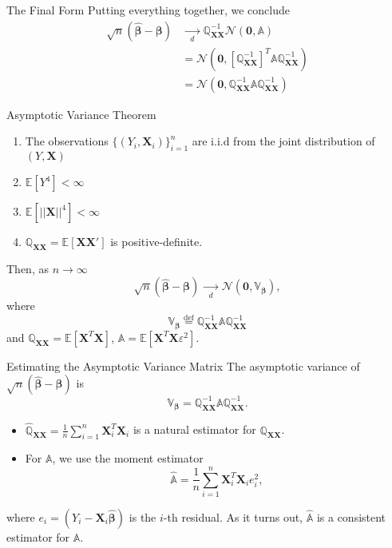 \documentclass[12pt, block=fill]{beamer}
\newcommand{\E}[1]{\mathbb{E}\left[#1\right]}
\renewcommand{\v}[1]{\pmb{#1}}
\newcommand{\m}[1]{\mathbb{#1}}
\newcommand{\eps}{\varepsilon}
\begin{document}
\begin{frame}{The Final Form}
Putting everything together, we conclude
$$
\begin{aligned}
	\sqrt{n}(\widehat{\v{\beta}}-\v{\beta}) &\xrightarrow[d]{\quad\quad}
\m{Q}_{\v{XX}}^{-1}\mathcal{N}(\v{0},\m{A}) \\
&=\mathcal{N}\left(\v{0},\left[\m{Q}_{\v{XX}}^{-1}\right]^T\m{A}\m{Q}_{\v{XX}}^{-1}\right) \\
&=\mathcal{N}\left(\v{0},\m{Q}_{\v{XX}}^{-1}\m{A}\m{Q}_{\v{XX}}^{-1}\right)
\end{aligned}
$$
\end{frame}

\begin{frame}
\begin{block}{Asymptotic Variance Theorem}
\begin{enumerate}
\item The observations $\{(Y_i,\v{X}_i)\}_{i=1}^n$ are i.i.d from the joint
distribution of $(Y,\v{X})$  
\item $\E{Y^4}<\infty$  
\item $\E{||\v{X}||^4}<\infty$  
\item $\m{Q}_{\v{XX}}=\E{\v{X}\v{X}'}$ is positive-definite.
\end{enumerate}
Then, as $n\to\infty$
$$
\sqrt{n}(\widehat{\v{\beta}}-\v{\beta})\xrightarrow[d]{\quad\quad}
\mathcal{N}\left(\v{0},\m{V}_{\v{\beta}}\right),
$$
where 
$$\m{V}_{\v{\beta}}\stackrel{\text{def}}{=}\m{Q}_{\v{XX}}^{-1}\m{A}\m{Q}_{\v{XX}}^{-1}$$
and $\m{Q}_{\v{XX}}=\E{\v{X}^T\v{X}}$, $\m{A}=\E{\v{X}^T\v{X}\eps^2}$.
\end{block}
\end{frame}

\begin{frame}{Estimating the Asymptotic Variance Matrix}
The asymptotic variance of $\sqrt{n}(\widehat{\v{\beta}}-\v{\beta})$ is
$$\m{V}_{\v{\beta}}=\m{Q}_{\v{XX}}^{-1}\m{A}\m{Q}_{\v{XX}}^{-1}.$$

\begin{itemize}
\item $\widehat{\m{Q}}_{\v{XX}}=\frac{1}{n}\sum\limits_{i=1}^n\v{X}_i^T\v{X}_i$ is a natural estimator for $\m{Q}_{\v{XX}}$. 
\item For $\m{A}$, we use the moment estimator
$$
\widehat{\m{A}}=\frac{1}{n}\sum\limits_{i=1}^n\v{X}_i^T\v{X}_ie_i^2,
$$
\end{itemize}
where $e_i=(Y_i-\v{X}_i\widehat{\v{\beta}})$ is the $i$-th residual. As it turns out, $\widehat{\m{A}}$ is a consistent estimator
for $\m{A}$.
\end{frame}
\end{document}
